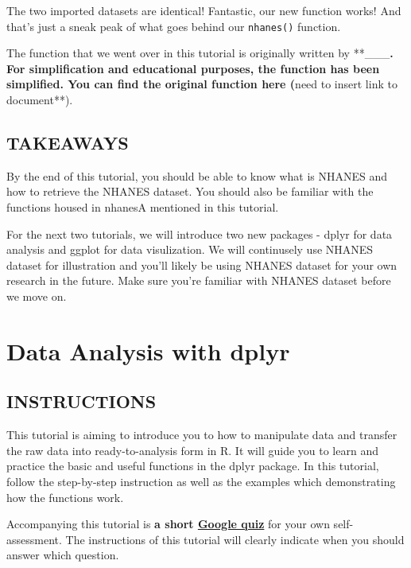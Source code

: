 \documentclass[
]{book}
\begin{document}
The two imported datasets are identical! Fantastic, our new function works! And that's just a sneak peak of what goes behind our \texttt{nhanes()} function.

The function that we went over in this tutorial is originally written by **\_\_\_\textbf{. For simplification and educational purposes, the function has been simplified. You can find the original function here (}need to insert link to document**).

\hypertarget{takeaways-1}{%
\section{TAKEAWAYS}\label{takeaways-1}}

By the end of this tutorial, you should be able to know what is NHANES and how to retrieve the NHANES dataset. You should also be familiar with the functions housed in nhanesA mentioned in this tutorial.

For the next two tutorials, we will introduce two new packages - dplyr for data analysis and ggplot for data visulization. We will continusely use NHANES dataset for illustration and you'll likely be using NHANES dataset for your own research in the future. Make sure you're familiar with NHANES dataset before we move on.

\hypertarget{data-analysis-with-dplyr}{%
\chapter{Data Analysis with dplyr}\label{data-analysis-with-dplyr}}

\hypertarget{instructions-4}{%
\section{INSTRUCTIONS}\label{instructions-4}}

This tutorial is aiming to introduce you to how to manipulate data and transfer the raw data into ready-to-analysis form in R. It will guide you to learn and practice the basic and useful functions in the dplyr package. In this tutorial, follow the step-by-step instruction as well as the examples which demonstrating how the functions work.

Accompanying this tutorial is \textbf{a short \href{https://forms.gle/17WnX6paHx5U14jx6}{Google quiz}} for your own self-assessment. The instructions of this tutorial will clearly indicate when you should answer which question.
\end{document}
